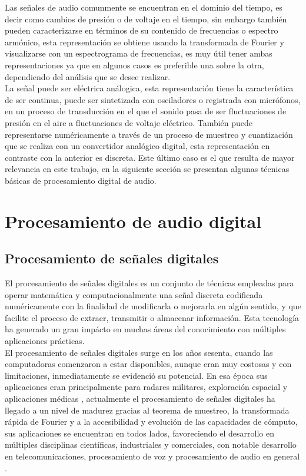 Las señales de audio comunmente se encuentran en el dominio del tiempo, es decir como cambios de presi\'on o de voltaje en el tiempo, sin embargo tambi\'en pueden caracterizarse en t\'erminos de su contenido de frecuencias o espectro arm\'onico, esta representaci\'on se obtiene usando la transformada de Fourier \cite{kamen} y visualizarse con un espectrograma de frecuencias, es muy \'util tener ambas representaciones ya que en algunos casos es preferible una sobre la otra, dependiendo del an\'alisis que se desee realizar.\\

La señal puede ser el\'ectrica an\'alogica, esta representaci\'on tiene la caracter\'istica de ser continua, puede ser sintetizada con osciladores o registrada con micr\'ofonos, en un proceso de transducci\'on en el que el sonido pasa de ser fluctuaciones de presi\'on en el aire a fluctuaciones de voltaje el\'ectrico. Tambi\'en puede representarse num\'ericamente a trav\'es de un proceso de muestreo y cuantizaci\'on que se realiza con un convertidor anal\'ogico digital, esta representaci\'on en contraste con la anterior es discreta. Este \'ultimo caso es el que resulta de mayor relevancia en este trabajo, en la siguiente secci\'on se presentan algunas t\'ecnicas b\'asicas de procesamiento digital de audio.\\




\section{Procesamiento de audio digital}

\subsection{Procesamiento de señales digitales}
El procesamiento de señales digitales es un conjunto de t\'ecnicas empleadas para operar matem\'atica y computacionalmente una señal discreta codificada num\'ericamente con la finalidad de modificarla o mejorarla en alg\'un sentido, y que facilite el proceso de extraer, transmitir o almacenar informaci\'on. Esta tecnolog\'ia ha generado un gran imp\'acto en muchas \'areas del conocimiento con m\'ultiples aplicaciones pr\'acticas.\\

El procesamiento de señales digitales surge en los años sesenta, cuando las computadoras comenzaron a estar disponibles, aunque eran muy costosas y con limitaciones, inmediatamente se evidenci\'o su potencial. En esa \'epoca sus aplicaciones eran principalmente para radares militares, exploraci\'on espacial y aplicaciones m\'edicas \cite{smith}, actualmente el procesamiento de señales digitales ha llegado a un nivel de madurez gracias al teorema de muestreo, la transformada r\'apida de Fourier y a la accesibilidad y evoluci\'on de las capacidades de c\'omputo,  sus aplicaciones se encuentran en todos lados, favoreciendo el desarrollo en m\'ultiples disciplinas cient\'ificas, industriales y comerciales, con notable desarrollo en telecomunicaciones, procesamiento de voz y procesamiento de audio en general \cite{li-cox}.\\


